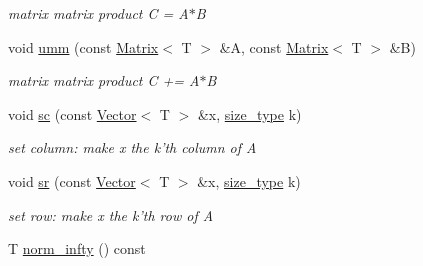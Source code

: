 \begin{DoxyCompactItemize}
\begin{DoxyCompactList}\small\item\em matrix matrix product C = A$\ast$B \item\end{DoxyCompactList}\item 
\hypertarget{classhdnum_1_1Matrix_a9c4539920d988a072fcb9582a64aaeef}{
void \hyperlink{classhdnum_1_1Matrix_a9c4539920d988a072fcb9582a64aaeef}{umm} (const \hyperlink{classhdnum_1_1Matrix}{Matrix}$<$ T $>$ \&A, const \hyperlink{classhdnum_1_1Matrix}{Matrix}$<$ T $>$ \&B)}
\label{classhdnum_1_1Matrix_a9c4539920d988a072fcb9582a64aaeef}

\begin{DoxyCompactList}\small\item\em matrix matrix product C += A$\ast$B \item\end{DoxyCompactList}\item 
\hypertarget{classhdnum_1_1Matrix_aaa1dfa0cd2e96e07799e1ae1d1a3d8d0}{
void \hyperlink{classhdnum_1_1Matrix_aaa1dfa0cd2e96e07799e1ae1d1a3d8d0}{sc} (const \hyperlink{classhdnum_1_1Vector}{Vector}$<$ T $>$ \&x, \hyperlink{classhdnum_1_1Matrix_adeafaf5fa5732e0d67f90ffa2119fbf1}{size\_\-type} k)}
\label{classhdnum_1_1Matrix_aaa1dfa0cd2e96e07799e1ae1d1a3d8d0}

\begin{DoxyCompactList}\small\item\em set column: make x the k'th column of A \item\end{DoxyCompactList}\item 
\hypertarget{classhdnum_1_1Matrix_ab274466f69f341a6a2dc18362284efe1}{
void \hyperlink{classhdnum_1_1Matrix_ab274466f69f341a6a2dc18362284efe1}{sr} (const \hyperlink{classhdnum_1_1Vector}{Vector}$<$ T $>$ \&x, \hyperlink{classhdnum_1_1Matrix_adeafaf5fa5732e0d67f90ffa2119fbf1}{size\_\-type} k)}
\label{classhdnum_1_1Matrix_ab274466f69f341a6a2dc18362284efe1}

\begin{DoxyCompactList}\small\item\em set row: make x the k'th row of A \item\end{DoxyCompactList}\item 
\hypertarget{classhdnum_1_1Matrix_a0ba1392f7d18208ca7940e2cff23599d}{
T \hyperlink{classhdnum_1_1Matrix_a0ba1392f7d18208ca7940e2cff23599d}{norm\_\-infty} () const }
\label{classhdnum_1_1Matrix_a0ba1392f7d18208ca7940e2cff23599d}


\end{DoxyCompactItemize}
